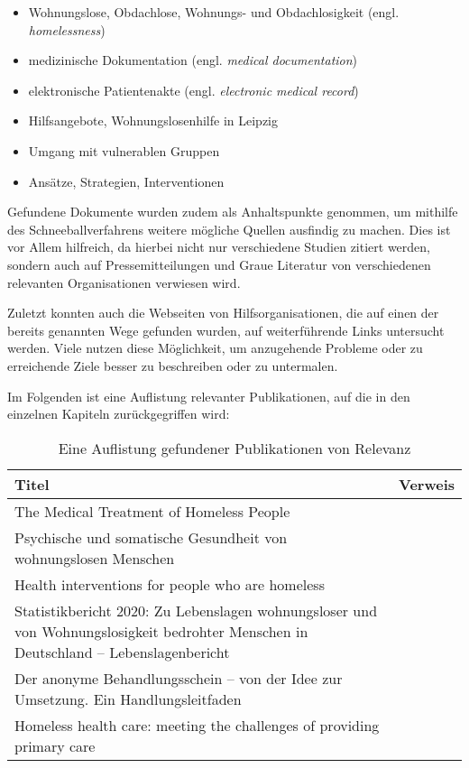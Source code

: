 \begin{itemize}
	\item Wohnungslose, Obdachlose, Wohnungs- und Obdachlosigkeit (engl. \textit{homelessness})
	\item medizinische Dokumentation (engl. \textit{medical documentation})
	\item elektronische Patientenakte (engl. \textit{electronic medical record})
	\item Hilfsangebote, Wohnungslosenhilfe in Leipzig
	\item Umgang mit vulnerablen Gruppen
	\item Ansätze, Strategien, Interventionen
\end{itemize}

Gefundene Dokumente wurden zudem als Anhaltspunkte genommen, um mithilfe des Schneeballverfahrens weitere mögliche Quellen ausfindig zu machen. Dies ist vor Allem hilfreich, da hierbei nicht nur verschiedene Studien zitiert werden, sondern auch auf Pressemitteilungen und Graue Literatur von verschiedenen relevanten Organisationen verwiesen wird.

Zuletzt konnten auch die Webseiten von Hilfsorganisationen, die auf einen der bereits genannten Wege gefunden wurden, auf weiterführende Links untersucht werden. Viele nutzen diese Möglichkeit, um anzugehende Probleme oder zu erreichende Ziele besser zu beschreiben oder zu untermalen.

Im Folgenden ist eine Auflistung relevanter Publikationen, auf die in den einzelnen Kapiteln zurückgegriffen wird:


\begin{table}[ht]
	\centering
	\textwidth
	\begin{tabulary}{\textwidth}{LL}
		\toprule
		Titel							&	Verweis\\
		\midrule
		The Medical Treatment of Homeless People &	\citet{Kaduszkiewicz.2017}\\
		Psychische und somatische Gesundheit von wohnungslosen Menschen &	\citet{DAE228829}\\
		Health interventions for people who are homeless &	\citet{Hwang.2014}\\
		Statistikbericht 2020: Zu Lebenslagen wohnungsloser und von Wohnungslosigkeit bedrohter Menschen in Deutschland -- Lebenslagenbericht &	\citet{BAGW.2022}\\
		Der anonyme Behandlungsschein -- von der Idee zur Umsetzung. Ein Handlungsleitfaden & \citet{Zanders.2022}\\
		Homeless health care: meeting the challenges of providing primary care &	\citet{Davies.2018}\\
		\bottomrule
	\end{tabulary}
	\caption[Relevante Publikationen]{Eine Auflistung gefundener Publikationen von Relevanz}
	\label{tab:pub}
\end{table}

